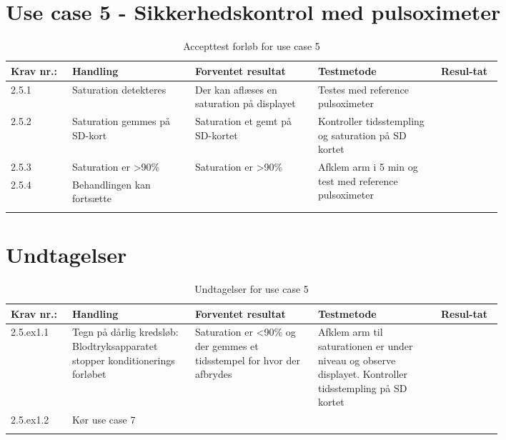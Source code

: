 \section{Use case 5 - Sikkerhedskontrol med pulsoximeter}
					\begin{longtable}{|p{0.1\linewidth}|p{0.2\linewidth}|p{0.2\linewidth}|p{0.2\linewidth}|p{0.1\linewidth}|}
							\hline
							\rowcolor{usDef}
							Krav nr.: & Handling & Forventet resultat & Testmetode & Resul-tat  \\\hline
							2.5.1 & Saturation detekteres & Der kan aflæses en saturation på displayet& Testes med reference pulsoximeter \fxnote{Tilføj reference} & \\ \hline
							2.5.2 & Saturation gemmes på SD-kort & Saturation et gemt på SD-kortet & Kontroller tidsstempling og saturation på SD kortet & \\ \hline
							2.5.3 & Saturation er \textgreater90\%  & \multirow{2}{\linewidth}{Saturation er \textgreater90\% } & \multirow{2}{\linewidth}{Afklem arm i 5 min og test med reference pulsoximeter} & \multirow{2}{\linewidth}{}  \\ \cline{1-2}
							2.5.4 & Behandlingen kan fortsætte & & & \\ \hline
							\caption{Accepttest forløb for use case 5}
					\end{longtable}
					
					\newpage
					\section*{Undtagelser}
					\begin{longtable}{|p{0.1\linewidth}|p{0.2\linewidth}|p{0.2\linewidth}|p{0.2\linewidth}|p{0.1\linewidth}|}
						\hline
						\rowcolor{usDef}
						Krav nr.: & Handling & Forventet resultat & Testmetode & Resul-tat  \\\hline
						2.5.ex1.1 & Tegn på dårlig kredsløb: Blodtryksapparatet stopper konditionerings forløbet & Saturation er \textless90\% og der gemmes et tidsstempel for hvor der afbrydes & Afklem arm til saturationen er  under niveau og observe displayet.
						Kontroller tidsstempling på SD kortet & \\ \hline
						2.5.ex1.2 & Kør use case 7 & \fxnote{TILFØJ TESTS }& & \\ \hline
						\caption{Undtagelser for use case 5}
					\end{longtable}